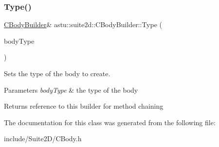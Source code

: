 \subsubsection{\texorpdfstring{Type()}{Type()}}
{\footnotesize\ttfamily \hyperlink{classastu_1_1suite2d_1_1CBodyBuilder}{C\+Body\+Builder}\& astu\+::suite2d\+::\+C\+Body\+Builder\+::\+Type (\begin{DoxyParamCaption}\item[{\hyperlink{classastu_1_1suite2d_1_1CBody_a5731a8b9f24de5494683e4b7e8016b64}{C\+Body\+::\+Type}}]{body\+Type }\end{DoxyParamCaption})\hspace{0.3cm}{\ttfamily [inline]}}

Sets the type of the body to create.


\begin{DoxyParams}{Parameters}
{\em body\+Type} & the type of the body \\
\hline
\end{DoxyParams}
\begin{DoxyReturn}{Returns}
reference to this builder for method chaining 
\end{DoxyReturn}


The documentation for this class was generated from the following file\+:\begin{DoxyCompactItemize}
\item 
include/\+Suite2\+D/C\+Body.\+h\end{DoxyCompactItemize}
